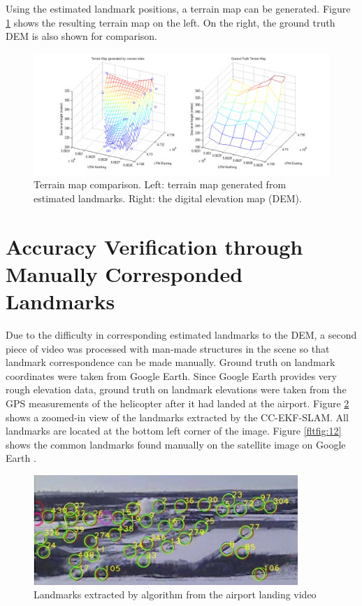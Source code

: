 Using the estimated landmark positions, a terrain map can be
generated. Figure \ref{fltfig:10} shows the resulting terrain map on
the left. On the right, the ground truth DEM is also shown for
comparison.

\begin{figure}[h]
\centering
\includegraphics[width=14cm, keepaspectratio=true]
{./Figures/fltfig/cut1/terrain/terrain_map_cmp.png}
\caption{Terrain map comparison. Left: terrain map generated from
  estimated landmarks. Right: the digital elevation map (DEM). }
\label{fltfig:10}
\end{figure}
\FloatBarrier

\section{Accuracy Verification through Manually Corresponded Landmarks}
\label{sec:flight-manual}
Due to the difficulty in corresponding estimated landmarks to the DEM,
a second piece of video was processed with man-made
structures in the scene so that landmark correspondence can be made
manually. Ground truth on landmark coordinates were taken from Google
Earth. Since Google Earth provides very rough elevation data,
ground truth on landmark elevations were taken from the GPS measurements of the
helicopter after it had landed at the airport. Figure \ref{fltfig:11}
shows a zoomed-in view of the landmarks extracted by the CC-EKF-SLAM.
All landmarks are located at the bottom left corner of the image.
Figure \ref{fltfig:12} shows the common landmarks found manually on
the satellite image on Google Earth \cite{_google_????}.

\begin{figure}[h]
\centering
\includegraphics[width=10cm, keepaspectratio=true]
{./Figures/fltfig/airport/frame398_landmarks.jpg}
\caption{Landmarks extracted by algorithm from the airport landing video }
\label{fltfig:11}
\end{figure}

